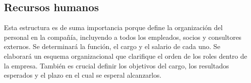 {\color{red}\subsection{Recursos humanos}

Esta estructura es de suma importancia porque define la organización del personal en la compañía, incluyendo a todos los empleados, socios y consultores externos. Se determinará la función, el cargo y el salario de cada uno. Se elaborará un esquema organizacional que clarifique el orden de los roles dentro de la empresa. También es crucial definir los objetivos del cargo, los resultados esperados y el plazo en el cual se esperal alcanzarlos.
}